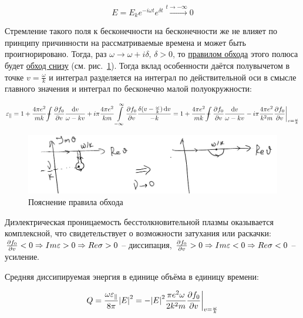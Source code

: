 \documentclass[10pt, a4paper]{article}
\def\Xint#1{\mathchoice
 {\XXint\displaystyle\textstyle{#1}}%
 {\XXint\textstyle\scriptstyle{#1}}%
 {\XXint\scriptstyle\scriptscriptstyle{#1}}%
 {\XXint\scriptscriptstyle\scriptscriptstyle{#1}}%
 \!\int}
\def\XXint#1#2#3{{\setbox0=\hbox{$#1{#2#3}{\int}$}
   \vcenter{\hbox{$#2#3$}}\kern-.5\wd0}}
\def\dashint{\Xint-}
\begin{document}
\begin{equation*}
	E = E_ke^{-i\omega t}e^{\delta t} \xrightarrow{t\rightarrow-\infty} 0
\end{equation*}

Стремление такого поля к бесконечности на бесконечности же не влияет по принципу причинности на рассматриваемые времена и может быть проигнорировано. Тогда, раз $\omega \rightarrow \omega+i\delta,\,\delta>0$, то \uline{правилом обхода} этого полюса будет \uline{обход снизу} (см. рис.~\ref{fig:residue}). Тогда вклад особенности даётся полувычетом в точке $v=\frac{\omega}{k}$ и интеграл разделяется на интеграл по действительной оси в смысле главного значения и интеграл по бесконечно малой полуокружности:

\begin{equation*}
	\varepsilon_\parallel = 1 + \frac{4\pi e^2}{mk} \dashint\pdv{f_0}{v}\frac{\dd{v}}{\omega-kv} + i\pi \frac{4\pi e^2}{km} \int\limits_{-\infty}^\infty \pdv{f_0}{v}\frac{\delta(v-\frac{\omega}{k})\dd{v}}{-k} = 1 + \frac{4\pi e^2}{mk} \dashint\pdv{f_0}{v}\frac{\dd{v}}{\omega-kv} - i\pi \frac{4\pi e^2}{k^2m} \pdv{f_0}{v}\bigg|_{v = \frac{\omega}{k}}
\end{equation*}

\begin{figure}[ht]
	\label{fig:residue} 
	\begin{center}
		\includegraphics[width=1\linewidth]{7.pole.pdf}
	\end{center}
	\caption{Пояснение правила обхода}
\end{figure}

Диэлектрическая проницаемость бесстолкновительной плазмы оказывается комплексной, что свидетельствует о возможности затухания или раскачки: $\pdv{f_0}{v}<0 \Rightarrow Im\varepsilon>0 \Rightarrow Re\sigma>0$ -- диссипация, $\pdv{f_0}{v}>0 \Rightarrow Im\varepsilon<0 \Rightarrow Re\sigma<0$ -- усиление.

Средняя диссипируемая энергия в единице объёма в единицу времени:

\begin{equation*}
	Q = \frac{\omega\varepsilon_\parallel}{8\pi}\abs{E}^2 = - \abs{E}^2 \frac{\pi e^2 \omega}{2k^2m}\pdv{f_0}{v}\bigg|_{v = \frac{\omega}{k}}
\end{equation*}
\end{document}
